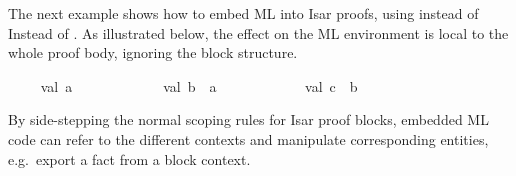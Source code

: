 \begin{isabellebody}
\begin{isamarkuptext}
  \medskip The next example shows how to embed ML into Isar proofs, using
 \hyperlink{command.ML-prf}{\mbox{}} instead of Instead of \hyperlink{command.ML}{\mbox{}}.
  As illustrated below, the effect on the ML environment is local to
  the whole proof body, ignoring the block structure.%
\end{isamarkuptext}%
\isamarkuptrue%
\isamarkupfalse%
\isanewline
{}\isanewline
%
\isadelimML
\ \ %
\endisadelimML
%
\isatagML
{}\isamarkupfalse%
\ {}\ val\ a\ {}\ {}\ {}\isanewline
\ \ \isamarkupfalse%
\isanewline
\ \ \ \ \isamarkupfalse%
\ {}\ val\ b\ {}\ a\ {}\ {}\ {}\isanewline
\ \ \isamarkupfalse%
\ %
\isanewline
\ \ \isamarkupfalse%
\ {}\ val\ c\ {}\ b\ {}\ {}\ {}\isanewline
{}\isamarkupfalse%
%
\endisatagML
{\isafoldML}%
%
\isadelimML
%
\endisadelimML
%
\begin{isamarkuptext}%
By side-stepping the normal scoping rules for Isar proof
  blocks, embedded ML code can refer to the different contexts and
  manipulate corresponding entities, e.g.\ export a fact from a block
  context.


\end{isamarkuptext}
\end{isabellebody}
